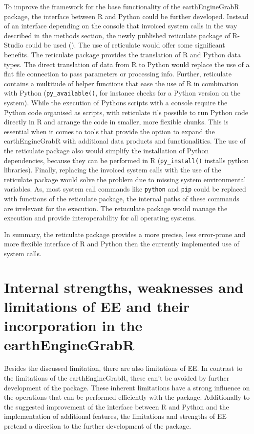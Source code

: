 To improve the framework for the base functionality of the earthEngineGrabR package, the interface between R and Python could be further developed. Instead of an interface depending on the console that invoiced system calls in the way described in the methods section, the newly published reticulate package of R-Studio could be used (\cite{reticulate}). The use of reticulate would offer some significant benefits. The reticulate package provides the translation of R and Python data types. The direct translation of data from R to Python would replace the use of a flat file connection to pass parameters or processing info. Further, reticulate contains a multitude of helper functions that ease the use of R in combination with Python (\texttt{py\_available()}, for instance checks for a Python version on the system). While the execution of Pythons scripts with a console require the Python code organised as scripts, with reticulate it's possible to run Python code directly in R and arrange the code in smaller, more flexible chunks. This is essential when it comes to tools that provide the option to expand the earthEngineGrabR with additional data products and functionalities. The use of the reticulate package also would simplify the installation of Python dependencies, because they can be performed in R (\texttt{py\_install()} installs python libraries). Finally, replacing the invoiced system calls with the use of the reticulate package would solve the problem due to missing system environmental variables. As, most system call commands like \texttt{python} and \texttt{pip} could be replaced with functions of the reticulate package, the internal paths of these commands are irrelevant for the execution. The retuculate package would manage the execution and provide interoperability for all operating systems.

In summary, the reticulate package provides a more precise, less error-prone and more flexible interface of R and Python then the currently implemented use of system calls.

\section{Internal strengths, weaknesses and limitations of EE and their incorporation in the earthEngineGrabR}

Besides the discussed limitation, there are also limitations of EE. In contrast to the limitations of the earthEngineGrabR, these can't be avoided by further development of the package. 
These inherent limitations have a strong influence on the operations that can be performed efficiently with the package.
Additionally to the suggested improvement of the interface between R and Python and the
implementation of additional features, the limitations and strengths of EE pretend a direction to the further development of the package.

